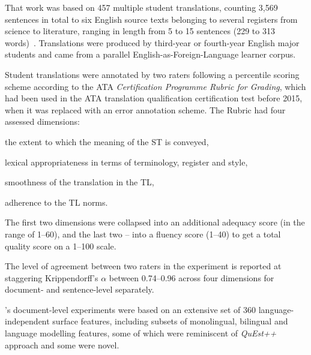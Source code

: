 That work was based on 457 multiple student translations, counting 3,569 sentences in total to six English source texts belonging to several registers from science to literature, ranging in length from 5 to 15 sentences (229 to 313 words)~\cite{Yuan2018}. Translations were produced by third-year or fourth-year English major students and came from a parallel English-as-Foreign-Language learner corpus.

Student translations were annotated by two raters following a percentile scoring scheme according to the \gls{ATA} \textit{Certification Programme Rubric for Grading}, which had been used in the ATA translation qualification certification test before 2015, when it was replaced with an error annotation scheme. The Rubric had four assessed dimensions:

\begin{description}\compresslist{}
	\item [1. usefulness] the extent to which the meaning of the ST is conveyed,
	\item [2. terminology] lexical appropriateness in terms of terminology, register and style,
	\item [3. idiomatic writing] smoothness of the translation in the TL,
	\item [4. target mechanics] adherence to the TL norms.
\end{description}

The first two dimensions were collapsed into an additional adequacy score (in the range of 1--60), and the last two -- into a fluency score (1--40) to get a total quality score on a 1--100 scale.

\label{pg:reliability_res1}
The level of agreement between two raters in the experiment is reported at staggering Krippendorff's $\alpha$ between 0.74--0.96 across four dimensions for document- and sentence-level separately.

\citeauthor{Yuan2018}'s \citeyear{Yuan2018} document-level experiments were based on an extensive set of 360 language-independent surface features, including subsets of monolingual, bilingual and language modelling features, some of which were reminiscent of \textit{QuEst++} approach and some were novel.

